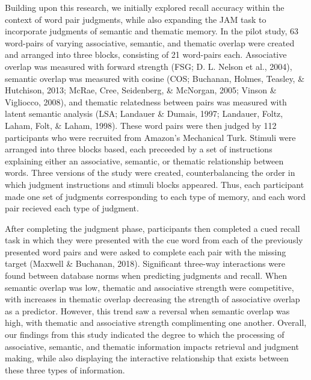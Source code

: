 \documentclass[english,man]{apa6}
\theoremstyle{definition}
\theoremstyle{definition}
\theoremstyle{definition}
\theoremstyle{remark}
\begin{document}
Building upon this research, we initially explored recall accuracy
within the context of word pair judgments, while also expanding the JAM
task to incorporate judgments of semantic and thematic memory. In the
pilot study, 63 word-pairs of varying associative, semantic, and
thematic overlap were created and arranged into three blocks, consisting
of 21 word-pairs each. Associative overlap was measured with forward
strength (FSG; D. L. Nelson et al., 2004), semantic overlap was measured
with cosine (COS; Buchanan, Holmes, Teasley, \& Hutchison, 2013; McRae,
Cree, Seidenberg, \& McNorgan, 2005; Vinson \& Vigliocco, 2008), and
thematic relatedness between pairs was measured with latent semantic
analysis (LSA; Landauer \& Dumais, 1997; Landauer, Foltz, Laham, Folt,
\& Laham, 1998). These word pairs were then judged by 112 participants
who were recruited from Amazon's Mechanical Turk. Stimuli were arranged
into three blocks based, each preceeded by a set of instructions
explaining either an associative, semantic, or thematic relationship
between words. Three versions of the study were created,
counterbalancing the order in which judgment instructions and stimuli
blocks appeared. Thus, each participant made one set of judgments
corresponding to each type of memory, and each word pair recieved each
type of judgment.

After completing the judgment phase, participants then completed a cued
recall task in which they were presented with the cue word from each of
the previously presented word pairs and were asked to complete each pair
with the missing target (Maxwell \& Buchanan, 2018). Significant
three-way interactions were found between database norms when predicting
judgments and recall. When semantic overlap was low, thematic and
associative strength were competitive, with increases in thematic
overlap decreasing the strength of associative overlap as a predictor.
However, this trend saw a reversal when semantic overlap was high, with
thematic and associative strength complimenting one another. Overall,
our findings from this study indicated the degree to which the
processing of associative, semantic, and thematic information impacts
retrieval and judgment making, while also displaying the interactive
relationship that exists between these three types of information.
\end{document}
